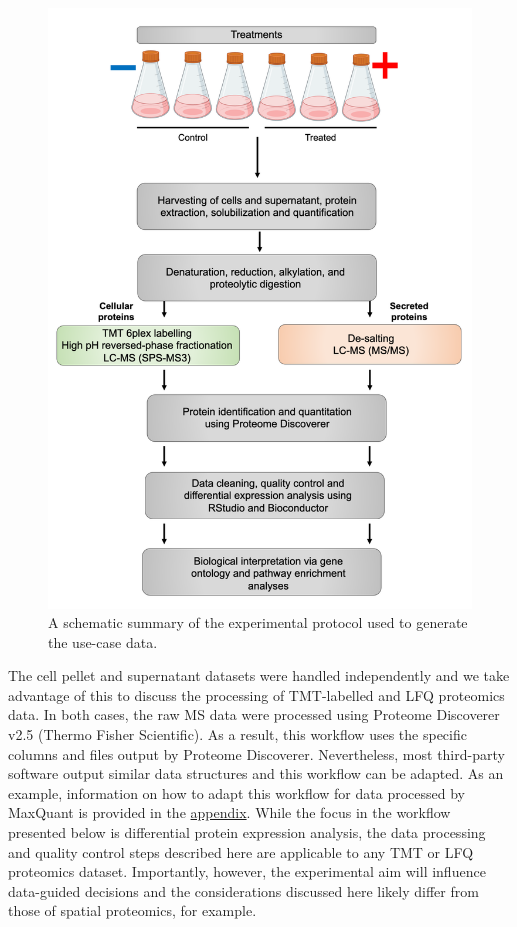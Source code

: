 \documentclass[9pt,a4paper,]{extarticle}
\begin{document}
\begin{figure}

{\centering \includegraphics[width=1\linewidth]{Images/experimental-method} 

}

\caption{A schematic summary of the experimental protocol used to generate the use-case data.}\label{fig:experimental-method}
\end{figure}

The cell pellet and supernatant datasets were handled independently and we take
advantage of this to discuss the processing of TMT-labelled and LFQ proteomics
data. In both cases, the raw MS data were processed using Proteome Discoverer
v2.5 (Thermo Fisher Scientific). As a result, this workflow uses the specific
columns and files output by Proteome Discoverer. Nevertheless, most third-party
software output similar data structures and this workflow can be adapted. As an
example, information on how to adapt this workflow for data processed by MaxQuant
is provided in the \href{https://github.com/CambridgeCentreForProteomics/f1000_expression_proteomics}{appendix}.
While the focus in the workflow presented below is differential protein expression
analysis, the data processing and quality control steps described here are
applicable to any TMT or LFQ proteomics dataset. Importantly, however, the
experimental aim will influence data-guided decisions and the considerations
discussed here likely differ from those of spatial proteomics, for example.
\end{document}
